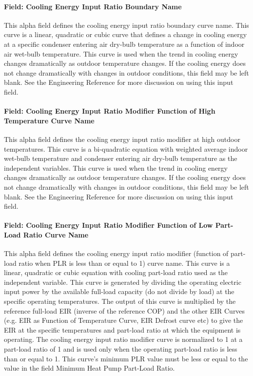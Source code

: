 \paragraph{Field: Cooling Energy Input Ratio Boundary Name}\label{field-cooling-energy-input-ratio-boundary-name}

This alpha field defines the cooling energy input ratio boundary curve name. This curve is a linear, quadratic or cubic curve that defines a change in cooling energy at a specific condenser entering air dry-bulb temperature as a function of indoor air wet-bulb temperature. This curve is used when the trend in cooling energy changes dramatically as outdoor temperature changes. If the cooling energy does not change dramatically with changes in outdoor conditions, this field may be left blank. See the Engineering Reference for more discussion on using this input field.

\paragraph{Field: Cooling Energy Input Ratio Modifier Function of High Temperature Curve Name}\label{field-cooling-energy-input-ratio-modifier-function-of-high-temperature-curve-name}

This alpha field defines the cooling energy input ratio modifier at high outdoor temperatures. This curve is a bi-quadratic equation with weighted average indoor wet-bulb temperature and condenser entering air dry-bulb temperature as the independent variables. This curve is used when the trend in cooling energy changes dramatically as outdoor temperature changes. If the cooling energy does not change dramatically with changes in outdoor conditions, this field may be left blank. See the Engineering Reference for more discussion on using this input field.

\paragraph{Field: Cooling Energy Input Ratio Modifier Function of Low Part-Load Ratio Curve Name}\label{field-cooling-energy-input-ratio-modifier-function-of-low-part-load-ratio-curve-name}

This alpha field defines the cooling energy input ratio modifier (function of part-load ratio when PLR is less than or equal to 1) curve name. This curve is a linear, quadratic or cubic equation with cooling part-load ratio used as the independent variable. This curve is generated by dividing the operating electric input power by the available full-load capacity (do not divide by load) at the specific operating temperatures. The output of this curve is multiplied by the reference full-load EIR (inverse of the reference COP) and the other EIR Curves (e.g. EIR as Function of Temperature Curve, EIR Defrost curve etc) to give the EIR at the specific temperatures and part-load ratio at which the equipment is operating. The cooling energy input ratio modifier curve is normalized to 1 at a part-load ratio of 1 and is used only when the operating part-load ratio is less than or equal to 1. This curve's minimum PLR value must be less or equal to the value in the field Minimum Heat Pump Part-Load Ratio.

